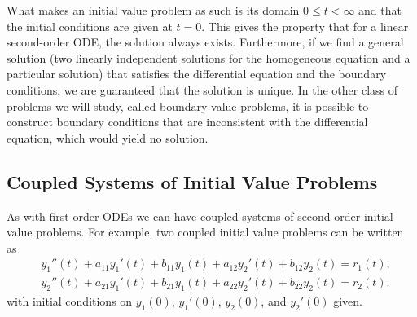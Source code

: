 What makes an initial value problem as such is its domain $0 \le t < \infty$ and that the initial conditions are given at $t = 0$. This gives the property that for a linear second-order ODE, the solution always exists. Furthermore, if we find a general solution (two linearly independent solutions for the homogeneous equation and a particular solution) that satisfies the differential equation and the boundary conditions, we are guaranteed that the solution is unique. In the other class of problems we will study, called boundary value problems, it is possible to construct boundary conditions that are inconsistent with the differential equation, which would yield no solution.

\subsection{Coupled Systems of Initial Value Problems}

As with first-order ODEs we can have coupled systems of second-order initial value problems. For example, two coupled initial value problems can be written as
\begin{align}
  &y_1''(t) + a_{11} y_1'(t) + b_{11} y_1(t) + a_{12} y_2'(t) + b_{12} y_2(t) = r_1(t), \nonumber \\
  &y_2''(t) + a_{21} y_1'(t) + b_{21} y_1(t) + a_{22} y_2'(t) + b_{22} y_2(t) = r_2(t).
\end{align}
with initial conditions on $y_1(0)$, $y_1'(0)$, $y_2(0)$, and $y_2'(0)$ given. 

